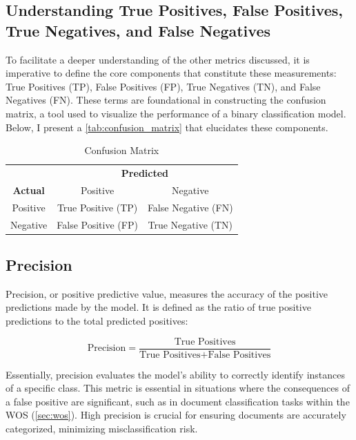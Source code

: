 \subsection{Understanding True Positives, False Positives, True Negatives, and False Negatives}

To facilitate a deeper understanding of the other metrics discussed, it is imperative to define the core components that constitute these measurements: True Positives (TP), False Positives (FP), True Negatives (TN), and False Negatives (FN). These terms are foundational in constructing the confusion matrix, a tool used to visualize the performance of a binary classification model. Below, I present a \autoref{tab:confusion_matrix} that elucidates these components.

\begin{table}[h]
    \centering
    \caption{Confusion Matrix}
    \begin{tabular}{|c|c|c|}
        \hline
                                          & \multicolumn{2}{c|}{\textbf{Predicted}}                       \\ \cline{2-3}
        \multirow{-2}{*}{\textbf{Actual}} & Positive                                & Negative            \\
        \hline
        Positive                          & True Positive (TP)                      & False Negative (FN) \\
        \hline
        Negative                          & False Positive (FP)                     & True Negative (TN)  \\
        \hline
    \end{tabular}

    \label{tab:confusion_matrix}
\end{table}


\subsection{Precision}

Precision, or positive predictive value, measures the accuracy of the positive predictions made by the model. It is defined as the ratio of true positive predictions to the total predicted positives:

$$
    \text{Precision} = \frac{\text{True Positives}}{\text{True Positives} + \text{False Positives}}
$$

Essentially, precision evaluates the model's ability to correctly identify instances of a specific class. This metric is essential in situations where the consequences of a false positive are significant, such as in document classification tasks within the WOS (\autoref{sec:wos}). High precision is crucial for ensuring documents are accurately categorized, minimizing misclassification risk.

